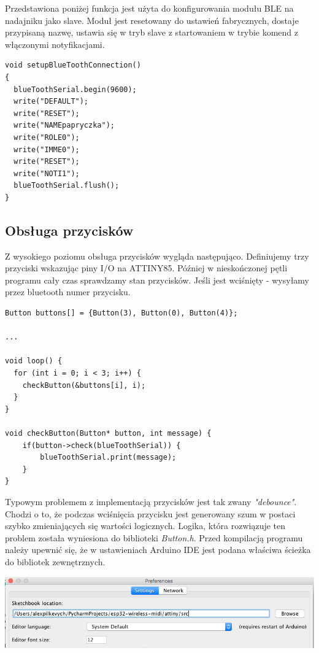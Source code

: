 \documentclass[eng,printmode]{mgr}
\begin{document}
Przedstawiona poniżej funkcja jest użyta do konfigurowania modułu BLE na nadajniku jako slave.
Moduł jest resetowany do ustawień fabrycznych, dostaje przypisaną nazwę, ustawia się w tryb slave z startowaniem w trybie komend z włączonymi notyfikacjami.

\begin{lstlisting}[language=Arduino]
void setupBlueToothConnection()
{
  blueToothSerial.begin(9600);
  write("DEFAULT");
  write("RESET");
  write("NAMEpapryczka");
  write("ROLE0");
  write("IMME0");
  write("RESET");
  write("NOTI1");
  blueToothSerial.flush();
}
\end{lstlisting}

\pagebreak
\subsection{Obsługa przycisków}

Z wysokiego poziomu obsługa przycisków wygląda następująco. Definiujemy trzy przyciski wskazując piny I/O na ATTINY85.
Później w nieskończonej pętli programu cały czas sprawdzamy stan przycisków. Jeśli jest wciśnięty - wysyłamy przez bluetooth numer przycisku.

\begin{lstlisting}[language=Arduino]
Button buttons[] = {Button(3), Button(0), Button(4)};

...

void loop() {
  for (int i = 0; i < 3; i++) {
    checkButton(&buttons[i], i);
  }
}

void checkButton(Button* button, int message) {
    if(button->check(blueToothSerial)) { 
        blueToothSerial.print(message);
    }
}
\end{lstlisting}

Typowym problemem z implementacją przycisków jest tak zwany \textit{"debounce"}. Chodzi o to, że podczas wciśnięcia przycisku jest generowany szum w postaci szybko zmieniających się wartości logicznych. Logika, która rozwiązuje ten problem została wyniesiona do biblioteki \textit{Button.h}.
Przed kompilacją programu należy upewnić się, że w ustawieniach Arduino IDE jest podana właściwa ścieżka do bibliotek zewnętrznych.

\includegraphics[width=\textwidth]{arduino-libraries}
\end{document}

